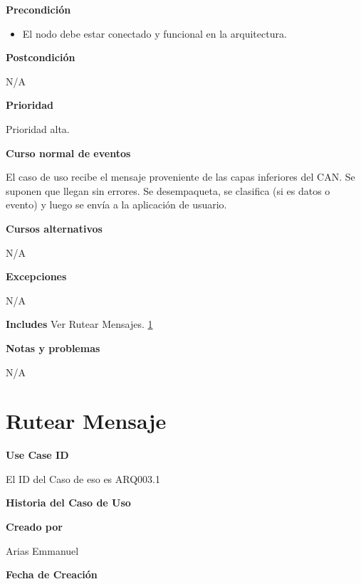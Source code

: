 \large\textbf{Precondición}
\begin{itemize}
\item El nodo debe estar conectado y funcional en la arquitectura.
\end{itemize}

\large\textbf{Postcondición}
\vspace{5mm}

N/A

\large\textbf{Prioridad}
\vspace{3mm}

Prioridad alta.

\large\textbf{Curso normal de eventos}
\vspace{3mm}

El caso de uso recibe el mensaje proveniente de las capas inferiores del CAN.
Se suponen que llegan sin errores. Se desempaqueta, se clasifica (si es datos
o evento) y luego se envía a la aplicación de usuario.

\large\textbf{Cursos alternativos}
\vspace{3mm}

N/A

\large\textbf{Excepciones}
\vspace{3mm}

N/A

\large\textbf{Includes}
\vspace{3mm}
Ver Rutear Mensajes. \ref{uc:RutearMensajes}

\large\textbf{Notas y problemas}
\vspace{3mm}

N/A



\section{Rutear Mensaje}\label{uc:RutearMensajes}

\large\textbf{Use Case ID}
\vspace{3mm}

El ID del Caso de eso es ARQ003.1

\Large\textbf{Historia del Caso de Uso}
\vspace{3mm}

\large\textbf{Creado por}
\vspace{3mm}

Arias Emmanuel

\large\textbf{Fecha de Creación}
\vspace{3mm}


